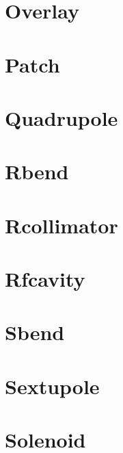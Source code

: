 \section{Overlay}
\label{s:over}

\section{Patch}
\label{s:patch}

\section{Quadrupole}
\label{s:quad}

\section{Rbend}
\label{s:rbend}

\section{Rcollimator}
\label{s:rcol}

\section{Rfcavity}
\label{s:rfcav}

\section{Sbend}
\label{s:sbend}

\section{Sextupole}
\label{s:sex}

\section{Solenoid}
\label{s:sol}

